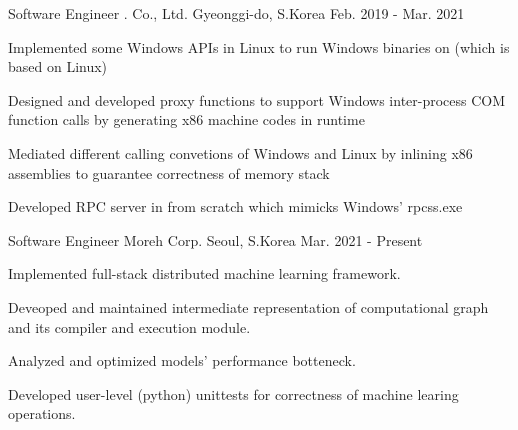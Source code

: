

\begin{cventries}

  \cventry
    {Software Engineer} %
    {\mycompany{}. Co., Ltd.} %
    {Gyeonggi-do, S.Korea} %
    {Feb. 2019 - Mar. 2021} %
    {
      \begin{cvitems} %
        \item {Implemented some Windows APIs in Linux to run Windows binaries on \mycompany{} (which is based on Linux)}
	\item {Designed and developed proxy functions to support Windows inter-process COM function calls by generating x86 machine codes in runtime}
	\item {Mediated different calling convetions of Windows and Linux by inlining x86 assemblies to guarantee correctness of memory stack}
	\item {Developed RPC server in \mycompany{} from scratch which mimicks Windows' rpcss.exe}  
      \end{cvitems}
    }

  \cventry
    {Software Engineer} %
    {Moreh Corp.} %
    {Seoul, S.Korea} %
    {Mar. 2021 - Present} %
    {
      \begin{cvitems} %
        \item {Implemented full-stack distributed machine learning framework.}
        \item {Deveoped and maintained intermediate representation of computational graph and its compiler and execution module.}
        \item {Analyzed and optimized models' performance botteneck.}
	\item {Developed user-level (python) unittests for correctness of machine learing operations.}
      \end{cvitems}
    }

\end{cventries}